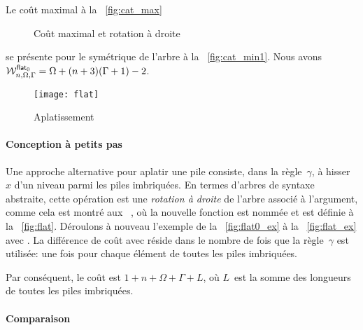 Le coût maximal à la
\fig~\ref{fig:cat_max}
\begin{figure}
\centering
{}
\qquad
{}
\qquad
{}
\caption{Coût maximal et rotation à droite}
\end{figure}
se présente pour le symétrique de l'arbre à la
\fig~\ref{fig:cat_min1}. Nous
avons
\(\W{\fun{flat}_0}{n,\Omega,\Gamma} = \Omega + (n+3)(\Gamma+1) - 2\).

%
\begin{wrapfigure}[7]{r}[0pt]{0pt}
\centering
\texttt{[image: flat]}%
\caption{Aplatissement}
\label{fig:flat}
\end{wrapfigure}

\paragraph{Conception à petits pas}

Une approche alternative pour aplatir une pile consiste, dans la
règle~\(\gamma\), à hisser~\(x\) d'un niveau parmi les piles
imbriquées. En termes d'arbres de syntaxe abstraite, cette opération
est une \emph{rotation à droite} de
l'arbre associé à l'argument, comme cela est montré aux
\figs~, où la nouvelle fonction est
nommée  et est définie à la
\fig~\vref{fig:flat}. Déroulons à nouveau l'exemple de la
\fig~\vref{fig:flat0_ex} à la \fig~\vref{fig:flat_ex} avec
. La différence de coût avec
 réside dans le nombre
de fois que la règle~\(\gamma\) est utilisée: une fois pour chaque
élément de toutes les piles imbriquées.

Par conséquent, le coût
\label{cost_flat} est \(1 + n + \Omega
+ \Gamma + L\), où \(L\)~est la somme des longueurs de toutes les
piles imbriquées.

\paragraph{Comparaison}

